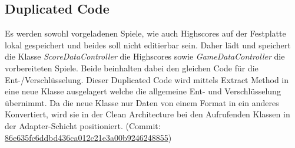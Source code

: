 \newpage
\subsection{Duplicated Code}

Es werden sowohl vorgeladenen Spiele, wie auch Highscores auf der Festplatte lokal gespeichert und beides soll nicht editierbar sein. Daher lädt und speichert die Klasse \textit{ScoreDataController} die Highscores sowie \textit{GameDataController} die vorbereiteten Spiele. Beide beinhalten dabei den gleichen Code für die Ent-/Verschlüsselung. Dieser Duplicated Code wird mittels Extract Method in eine neue Klasse ausgelagert welche die allgemeine Ent- und Verschlüsselung übernimmt. Da die neue Klasse nur Daten von einem Format in ein anderes Konvertiert, wird sie in der Clean Architecture bei den Aufrufenden Klassen in der Adapter-Schicht positioniert. (Commit: \href{https://github.com/EinToni/Wortfinder/commit/86e635fc6ddbd436ca012c21e3a00b9246248855}{ 86e635fc6ddbd436ca012c21e3a00b9246248855})

\endinput